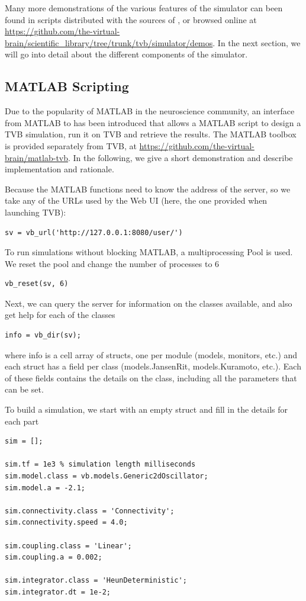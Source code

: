 Many more demonstrations of the various features of the simulator
can been found in scripts distributed with the sources of \TVB, or 
browsed online at \url{https://github.com/the-virtual-brain/scientific_library/tree/trunk/tvb/simulator/demos}.
In the next section, we will go into detail about the different
components of the simulator.

\subsection{MATLAB Scripting}

Due to the popularity of MATLAB in the neuroscience community, an
interface from MATLAB to \TVB has been introduced that allows a MATLAB
script to design a TVB simulation, run it on TVB and retrieve the 
results. The MATLAB toolbox is provided separately from TVB, at
\url{https://github.com/the-virtual-brain/matlab-tvb}.
In the following, we give a short demonstration and 
describe implementation and rationale.

Because the MATLAB functions need to know the address of the server,
so we take any of the URLs used by the Web UI (here, the one provided
when launching TVB):

\begin{lstlisting}
sv = vb_url('http://127.0.0.1:8080/user/')
\end{lstlisting}

To run simulations without blocking MATLAB, a multiprocessing Pool
is used. We reset the pool and change the number of processes to 6

\begin{lstlisting}
vb_reset(sv, 6)
\end{lstlisting}

Next, we can query the server for information on the classes available,
and also get help for each of the classes

\begin{lstlisting}
info = vb_dir(sv);
\end{lstlisting}

\noindent where info is a cell array of structs, one per module (models,
monitors, etc.) and each struct has a field per class (models.JansenRit, 
models.Kuramoto, etc.). Each of these fields contains the details on 
the class, including all the parameters that can be set. 

To build a simulation, we start with an empty struct
and fill in the details for each part

\begin{lstlisting}
sim = [];

sim.tf = 1e3 % simulation length milliseconds
sim.model.class = vb.models.Generic2dOscillator;
sim.model.a = -2.1;

sim.connectivity.class = 'Connectivity';
sim.connectivity.speed = 4.0;

sim.coupling.class = 'Linear';
sim.coupling.a = 0.002;

sim.integrator.class = 'HeunDeterministic';
sim.integrator.dt = 1e-2;
\end{lstlisting}

